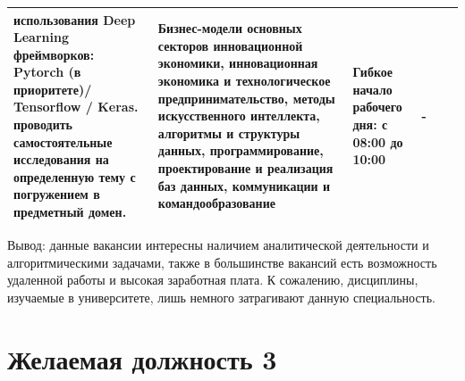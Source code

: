\documentclass[14pt]{extreport}
\begin{document}
\begin{landscape}
\begin{longtable}{|p{}|p{}|p{}|p{}|p{}|p{}|}
\newline  использования Deep Learning фреймворков: Pytorch (в приоритете)/ Tensorflow / Keras.
 проводить самостоятельные исследования на определенную тему с погружением в предметный домен.
 & Бизнес-модели основных секторов инновационной экономики, инновационная экономика и технологическое предпринимательство, методы искусственного интеллекта, алгоритмы и структуры данных, программирование, проектирование и реализация баз данных, коммуникации и командообразование & Гибкое начало рабочего дня: с 08:00 до 10:00 & - \\
\hline   
\end{longtable}

\fontsize{14pt}{14pt}\selectfont
Вывод: данные вакансии интересны наличием аналитической деятельности и алгоритмическими задачами, также в большинстве вакансий есть возможность удаленной работы и высокая заработная плата. К сожалению, дисциплины, изучаемые в университете, лишь немного затрагивают данную специальность.

\section{Желаемая должность 3}


\end{landscape}
\end{document}
